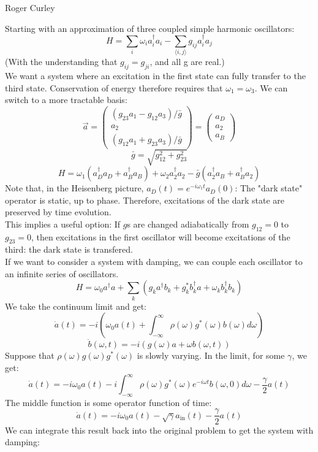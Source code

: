 \documentclass[final]{article}
\begin{document}
\begin{flushright}
Roger Curley
\end{flushright}
Starting with an approximation of three coupled simple harmonic oscillators:
\[H=\sum_i \omega_i a_i^\dagger a_i-\sum_{\langle i,j\rangle} g_{ij} a_i^\dagger a_j\]
(With the understanding that \(g_{ij}=g_{ji}\), and all g are real.)\\
We want a system where an excitation in the first state can fully transfer to the third state. Conservation of energy therefore requires that \(\omega_1=\omega_3\).
We can switch to a more tractable basis:
\[\vec a=\begin{pmatrix}(g_{23}a_1-g_{12}a_3)/\bar g\\a_2\\(g_{12}a_1+g_{23}a_3)/\bar g\end{pmatrix}=\begin{pmatrix}a_D\\a_2\\a_B\end{pmatrix}\]
\[\bar g=\sqrt{g_{12}^2+g_{23}^2}\]
\[H=\omega_1\left(a_D^\dagger a_D+a_B^\dagger a_B\right)+\omega_2a_2^\dagger a_2-\bar g\left(a_2^\dagger a_B+a_B^\dagger a_2\right)\]
Note that, in the Heisenberg picture, \(a_D(t)=e^{-i\omega_1 t} a_D(0)\): The "dark state" operator is static, up to phase. Therefore, excitations of the dark state are preserved by time evolution.\\
This implies a useful option: If \(g\)s are changed adiabatically from \(g_{12}=0\) to \(g_{23}=0\), then excitations in the first oscillator will become excitations of the third: the dark state is transfered.\\
If we want to consider a system with damping, we can couple each oscillator to an infinite series of oscillators.
\[H=\omega_0 a^\dagger a+\sum_k (g_k a^\dagger b_k+g_k^* b_k^\dagger a+\omega_k b_k^\dagger b_k)\]
We take the continuum limit and get:
\[\dot a(t)=-i\left(\omega_0 a(t)+\int_{-\infty}^\infty \rho(\omega) g^*(\omega) b(\omega) d\omega\right)\]
\[\dot b(\omega,t)=-i(g(\omega) a+\omega b(\omega,t))\]
Suppose that \(\rho(\omega)g(\omega)g^*(\omega)\) is slowly varying. In the limit, for some \(\gamma\), we get:
\[\dot a(t)=-i\omega_0 a(t)-i\int_{-\infty}^\infty \rho(\omega) g^*(\omega) 
e^{-i\omega t}b(\omega,0)d\omega- \frac{\gamma}{2} a(t)\]
The middle function is some operator function of time:
\[\dot a(t)=-i\omega_0 a(t)-\sqrt{\gamma}a_{\text{in}}(t)- \frac{\gamma}{2} a(t)\]
We can integrate this result back into the original problem to get the system with damping:
\end{document}
